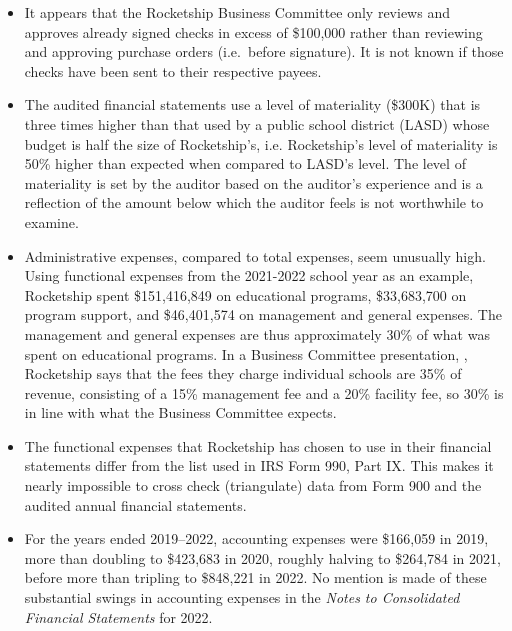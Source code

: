 \begin{itemize}
  \item It appears that the Rocketship Business Committee only reviews and approves already signed checks in excess of \$100,000 rather than reviewing and approving purchase orders (i.e.\ before signature). It is not known if those checks have been sent to their respective payees.

  \item The audited financial statements use a level of materiality (\$300K) that is three times higher than that used by a public school district (LASD) whose budget is half the size of Rocketship's, i.e. Rocketship's level of materiality is 50\% higher than expected when compared to LASD's level. The level of materiality is set by the auditor based on the auditor's experience and is a reflection of the amount below which the auditor feels is not worthwhile to examine.

  \item Administrative expenses, compared to total expenses, seem unusually high. Using functional expenses from the 2021-2022 school year as an example, Rocketship spent \$151,416,849 on educational programs, \$33,683,700 on program support, and \$46,401,574 on management and general expenses.  The management and general expenses are thus approximately 30\% of what was spent on educational programs. In a Business Committee presentation, \textcite[28]{Mukhopadhyay2013}, Rocketship says that the fees they charge individual schools are 35\% of revenue, consisting of a 15\% management fee and a 20\% facility fee, so 30\% is in line with what the Business Committee expects.

  \item The functional expenses that Rocketship has chosen to use in their financial statements differ from the list used in IRS Form 990, Part IX\@. This makes it nearly impossible to cross check (triangulate) data from Form 900 and the audited annual financial statements.

  \item  For the years ended 2019–2022, accounting expenses were \$166,059 in 2019, more than doubling to \$423,683 in 2020, roughly halving to \$264,784 in 2021, before more than tripling to \$848,221 in 2022. No mention is made of these substantial swings in accounting expenses in the \textit{Notes to Consolidated Financial Statements} for 2022.


\end{itemize}
